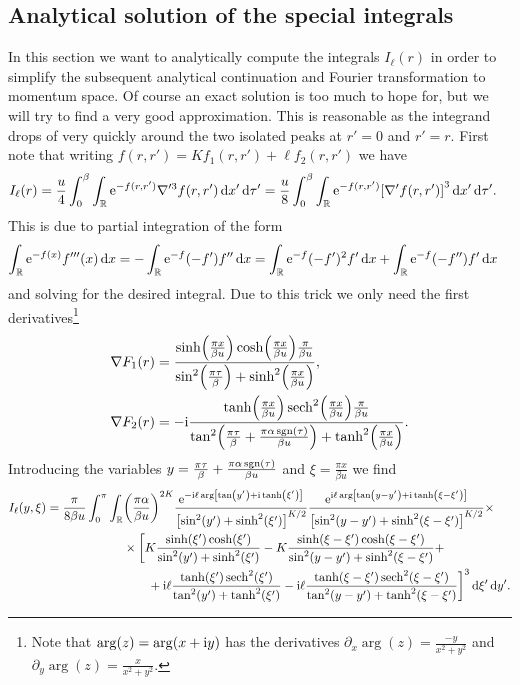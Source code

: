 \documentclass[english, parskip=full]{scrartcl}
\begin{document}
\subsection{Analytical solution of the special integrals}
In this section we want to analytically compute the integrals $I_\ell(r)$ in order to simplify the subsequent analytical continuation and Fourier transformation to momentum space.
Of course an exact solution is too much to hope for, but we will try to find a very good approximation.
This is reasonable as the integrand drops of very quickly around the two isolated peaks at $r'=0$ and $r'=r$.
First note that writing $f(r,r') = Kf_1(r,r') + \ell f_2(r,r')$ we have
\begin{align}
I_\ell(r) &= \frac{u}{4} \intx{0}{\beta}{\intr{\powe{-f(r,r')} \nabla'^3 f(r,r')}{x'}}{\tau'} = \frac{u}{8} \intx{0}{\beta}{\intr{\powe{-f(r,r')} \klb*{\nabla' f(r,r')}^3}{x'}}{\tau'}.
\end{align}
This is due to partial integration of the form
\begin{align}
\int_{\mathbb{R}} \text{e}^{-f(x)} f'''(x) \, \mathrm{d}x &= -\int_{\mathbb{R}} \text{e}^{-f}(-f')f'' \, \mathrm{d}x = \int_{\mathbb{R}} \text{e}^{-f} (-f')^2f' \, \mathrm{d}x + \int_{\mathbb{R}} \text{e}^{-f}(-f'') f' \, \mathrm{d}x
\end{align}
and solving for the desired integral.
Due to this trick we only need the first derivatives\footnote{Note that $\arg(z) = \arg(x+\text{i} y)$ has the derivatives $\partial_x \arg(z) = \frac{-y}{x^2 + y^2}$ and $\partial_y \arg(z) = \frac{x}{x^2 + y^2}$.}
\begin{align}
\nabla F_1(r) &= \frac{\sinh\kla*{\frac{\pi x}{\beta u}} \cosh\kla*{\frac{\pi x}{\beta u}} \frac{\pi}{\beta u}}{\sin^2\kla*{\frac{\pi\tau}{\beta}} + \sinh^2\kla*{\frac{\pi x}{\beta u}}},\\
\nabla F_2(r) &= -\i \frac{\tanh\kla*{\frac{\pi x}{\beta u}} \sech^2 \kla*{\frac{\pi x}{\beta u}} \frac{\pi}{\beta u}}{\tan^2\kla*{\frac{\pi\tau}{\beta} + \frac{\pi\alpha \sgn(\tau)}{\beta u}} + \tanh^2\kla*{\frac{\pi x}{\beta u}}}.
\end{align}
Introducing the variables $y = \frac{\pi\tau}{\beta} + \frac{\pi\alpha \operatorname{sgn}(\tau)}{\beta u}$ and $\xi = \frac{\pi x}{\beta u}$ we find
\begin{align}
\bsplit{I_\ell(y,\xi) = \frac{\pi}{8\beta u} \intx{0}{\pi}{\intr{&\kla*{\frac{\pi\alpha}{\beta u}}^{2K} \frac{\powe{-\i\ell\arg \klb*{\tan(y') + \i \tanh(\xi')}}}{\klb*{\sin^2(y') + \sinh^2(\xi')}^{K/2}} \frac{\powe{\i\ell\arg \klb*{\tan(y-y') + \i \tanh(\xi-\xi')}}}{\klb*{\sin^2(y-y') + \sinh^2(\xi-\xi')}^{K/2}} \times \\
& \times\klb[\bigg]{K\frac{\sinh(\xi')\cosh(\xi')}{\sin^2(y') + \sinh^2(\xi')} - K\frac{\sinh(\xi-\xi')\cosh(\xi-\xi')}{\sin^2(y-y') + \sinh^2(\xi-\xi')} + \\
&\qquad + \i\ell \frac{\tanh(\xi') \sech^2(\xi')}{\tan^2(y') + \tanh^2(\xi')} - \i\ell \frac{\tanh(\xi-\xi') \sech^2(\xi-\xi')}{\tan^2(y-y') + \tanh^2(\xi-\xi')}}^3}{\xi'} }{y'}.}
\end{align}
\end{document}

